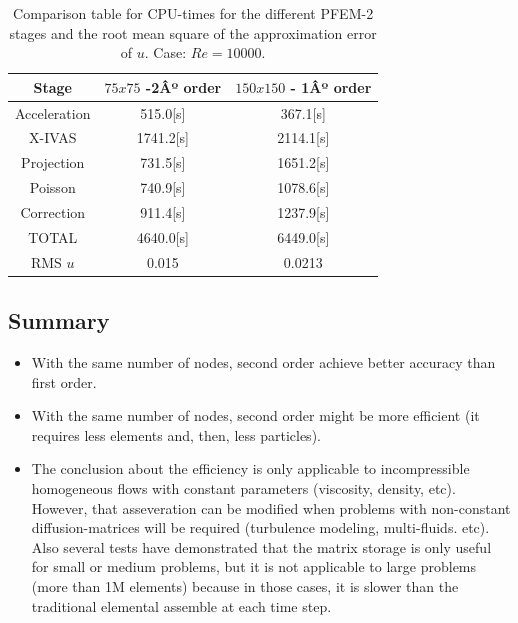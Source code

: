 \documentclass[a4paper,conference]{IEEEtran}
\begin{document}
\begin{table}[htbp]
\begin{center}
{\footnotesize
\begin{tabular}[h]{||c|c|c||}
    \hline
      Stage & $75x75$  -2Âº order & $150x150$ - 1Âº order\\
      \hline
      \hline
	Acceleration & 515.0[s]& 367.1[s]\\
	X-IVAS & 1741.2[s]& 2114.1[s] \\
	Projection & 731.5[s]& 1651.2[s]\\
	Poisson & 740.9[s]& 1078.6[s]\\
	Correction & 911.4[s]& 1237.9[s]\\
      \hline
	TOTAL & 4640.0[s]& 6449.0[s]\\
      \hline
      \hline
	RMS $u$ & 0.015 & 0.0213 \\
      \hline
      \hline
\end{tabular}
}
\caption{\label{Tabla:times_Re_10000} Comparison table for CPU-times for the different PFEM-2 stages and the root mean square of the approximation error of $u$. Case: $Re=10000$.}
\end{center}
\end{table}

\newpage

\subsection{Summary}

  \begin{itemize}
   \item With the same number of nodes, second order achieve better accuracy than first order.
   \item With the same number of nodes, second order might be more efficient (it requires less elements and, then, less particles).
   \item The conclusion about the efficiency is only applicable to incompressible homogeneous flows with constant parameters (viscosity, density, etc). However, that asseveration can be modified when problems with non-constant diffusion-matrices will be required (turbulence modeling, multi-fluids. etc). Also several tests have demonstrated that the matrix storage is only useful for small or medium problems, but it is not applicable to large problems (more than 1M elements) because in those cases, it is slower than the traditional elemental assemble at each time step.
  \end{itemize}
\end{document}
